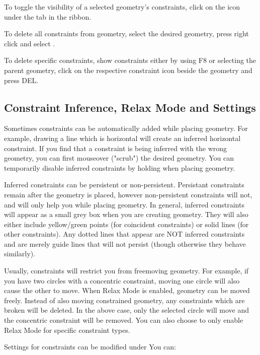 To toggle the visibility of a selected geometry's constraints, click on the  icon under the  tab in the ribbon.

To delete all constraints from geometry, select the desired geometry, press right click and select .

To delete specific constraints, show constraints either by using F8 or selecting the parent geometry, click on the respective constraint icon beside the geometry and press DEL.
\cbend
\subsection{Constraint Inference, Relax Mode and Settings}

\cbstart
{}

Sometimes constraints can be automatically added while placing geometry. For example, drawing a line which is horizontal will create an inferred horizontal constraint. If you find that a constraint is being inferred with the wrong geometry, you can first mouseover ("scrub") the desired geometry. You can temporarily disable inferred constraints by holding  when placing geometry.



Inferred constraints can be persistent or non-persistent. Persistant constraints remain after the geometry is placed, however non-persistent constraints will not, and will only help you while placing geometry. In general, inferred constraints will appear as a small grey box when you are creating geometry. They will also either include yellow/green points (for coincident constraints) or solid lines (for other constraints). Any dotted lines that appear are NOT inferred constraints and are merely guide lines that will not persist (though otherwise they behave similarly).

Usually, constraints will restrict you from freemoving geometry. For example, if you have two circles with a concentric constraint, moving one circle will also cause the other to move. When Relax Mode is enabled, geometry can be moved freely. Instead of also moving constrained geometry, any constraints which are broken will be deleted. In the above case, only the selected circle will move and the concentric constraint will be removed. You can also choose to only enable Relax Mode for specific constraint types.

Settings for constraints can be modified under  You can:


